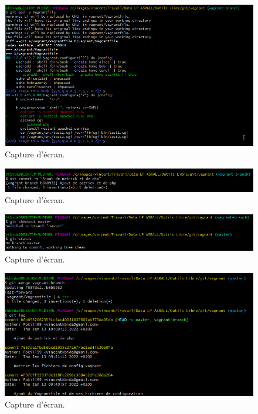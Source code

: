 \documentclass{article}
\begin{document}
\begin{figure}[h]
\centering
\includegraphics[width=\textwidth]{images/q3-2-3.png}
\caption{\label{fig:frog}Capture d'écran.}
\end{figure}

\begin{figure}[h]
\centering
\includegraphics[width=\textwidth]{images/q3-2-4.png}
\caption{\label{fig:frog}Capture d'écran.}
\end{figure}

\begin{figure}[h]
\centering
\includegraphics[width=\textwidth]{images/q3-2-5.png}
\caption{\label{fig:frog}Capture d'écran.}
\end{figure}

\begin{figure}[h]
\centering
\includegraphics[width=\textwidth]{images/q3-2-6.png}
\caption{\label{fig:frog}Capture d'écran.}
\end{figure}
\end{document}
